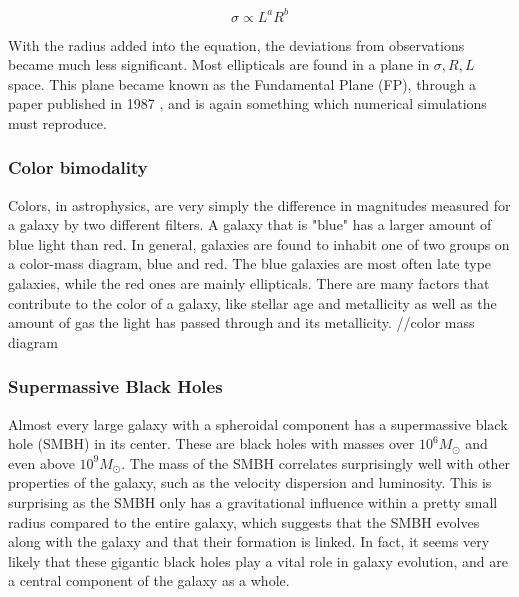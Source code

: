 \begin{equation}
    \sigma \propto L^a R^b
\end{equation}

With the radius added into the equation, the deviations from observations became much less significant. Most ellipticals are found in a plane in ${\sigma, R, L}$ space. This plane became known as the Fundamental Plane (FP), through a paper published in 1987 \parencite{Djorgovski1987}, and is again something which numerical simulations must reproduce.

\subsubsection{Color bimodality}
Colors, in astrophysics, are very simply the difference in magnitudes measured for a galaxy by two different filters. A galaxy that is "blue" has a larger amount of blue light than red. In general, galaxies are found to inhabit one of two groups on a color-mass diagram, blue and red. The blue galaxies are most often late type galaxies, while the red ones are mainly ellipticals. There are many factors that contribute to the color of a galaxy, like stellar age and metallicity as well as the amount of gas the light has passed through and its metallicity.
//color mass diagram

\subsubsection{Supermassive Black Holes}
Almost every large galaxy with a spheroidal component has a supermassive black hole (SMBH) in its center. These are black holes with masses over $10^6 M_{\odot}$ and even above $10^9 M_{\odot}$. The mass of the SMBH correlates surprisingly well with other properties of the galaxy, such as the velocity dispersion and luminosity. This is surprising as the SMBH only has a gravitational influence within a pretty small radius compared to the entire galaxy, which suggests that the SMBH evolves along with the galaxy and that their formation is linked. In fact, it seems very likely that these gigantic black holes play a vital role in galaxy evolution, and are a central component of the galaxy as a whole.